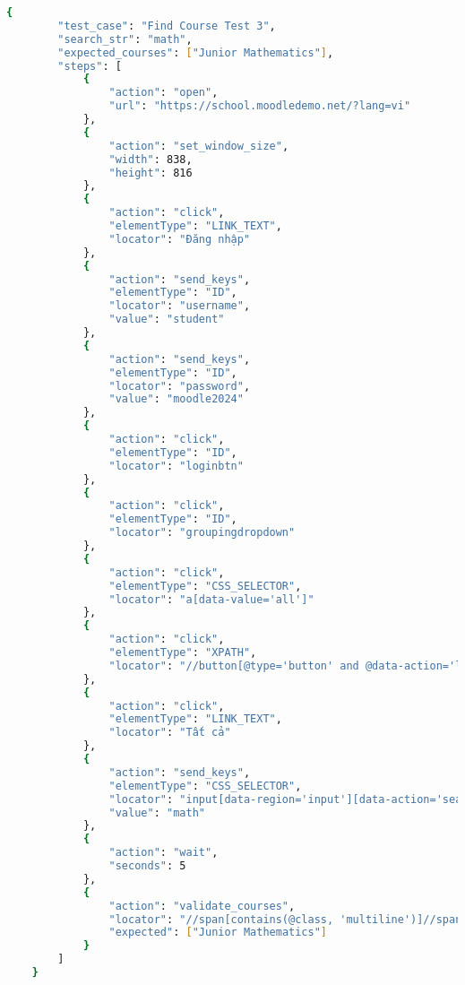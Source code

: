 \begin{lstlisting}[language=bash, caption={Ví dụ testcase FC-001-0003 ở level 2}, breaklines=true]
    {
        "test_case": "Find Course Test 3",
        "search_str": "math",
        "expected_courses": ["Junior Mathematics"],
        "steps": [
            {
                "action": "open",
                "url": "https://school.moodledemo.net/?lang=vi"
            },
            {
                "action": "set_window_size",
                "width": 838,
                "height": 816
            },
            {
                "action": "click",
                "elementType": "LINK_TEXT",
                "locator": "Đăng nhập"
            },
            {
                "action": "send_keys",
                "elementType": "ID",
                "locator": "username",
                "value": "student"
            },
            {
                "action": "send_keys",
                "elementType": "ID",
                "locator": "password",
                "value": "moodle2024"
            },
            {
                "action": "click",
                "elementType": "ID",
                "locator": "loginbtn"
            },
            {
                "action": "click",
                "elementType": "ID",
                "locator": "groupingdropdown"
            },
            {
                "action": "click",
                "elementType": "CSS_SELECTOR",
                "locator": "a[data-value='all']"
            },
            {
                "action": "click",
                "elementType": "XPATH",
                "locator": "//button[@type='button' and @data-action='limit-toggle']"
            },
            {
                "action": "click",
                "elementType": "LINK_TEXT",
                "locator": "Tất cả"
            },
            {
                "action": "send_keys",
                "elementType": "CSS_SELECTOR",
                "locator": "input[data-region='input'][data-action='search']",
                "value": "math"
            },
            {
                "action": "wait",
                "seconds": 5
            },
            {
                "action": "validate_courses",
                "locator": "//span[contains(@class, 'multiline')]//span[@class='sr-only']",
                "expected": ["Junior Mathematics"]
            }
        ]
    }
\end{lstlisting}
